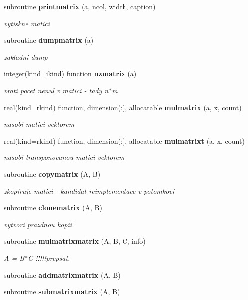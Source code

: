 \begin{DoxyCompactItemize}
subroutine {\bf printmatrix} (a, ncol, width, caption)
\begin{DoxyCompactList}\small\item\em vytiskne matici \end{DoxyCompactList}\item 
subroutine {\bf dumpmatrix} (a)
\begin{DoxyCompactList}\small\item\em zakladni dump \end{DoxyCompactList}\item 
integer(kind=ikind) function {\bf nzmatrix} (a)
\begin{DoxyCompactList}\small\item\em vrati pocet nenul v matici -\/ tady n$\ast$m \end{DoxyCompactList}\item 
real(kind=rkind) function, dimension(\+:), allocatable {\bf mulmatrix} (a, x, count)
\begin{DoxyCompactList}\small\item\em nasobi matici vektorem \end{DoxyCompactList}\item 
real(kind=rkind) function, dimension(\+:), allocatable {\bf mulmatrixt} (a, x, count)
\begin{DoxyCompactList}\small\item\em nasobi transponovanou matici vektorem \end{DoxyCompactList}\item 
subroutine {\bf copymatrix} (A, B)
\begin{DoxyCompactList}\small\item\em zkopiruje matici -\/ kandidat reimplementace v potomkovi \end{DoxyCompactList}\item 
subroutine {\bf clonematrix} (A, B)
\begin{DoxyCompactList}\small\item\em vytvori prazdnou kopii \end{DoxyCompactList}\item 
subroutine {\bf mulmatrixmatrix} (A, B, C, info)
\begin{DoxyCompactList}\small\item\em A = B$\ast$C !!!!!prepsat. \end{DoxyCompactList}\item 
subroutine {\bf addmatrixmatrix} (A, B)
\item 
subroutine {\bf submatrixmatrix} (A, B)

\end{DoxyCompactItemize}

